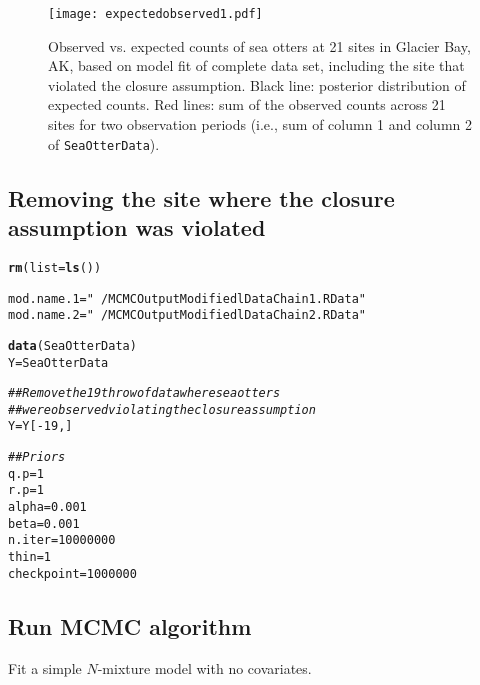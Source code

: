 \documentclass[12pt,letterpaper,final]{article}\usepackage[]{graphicx}\usepackage[]{color}
\makeatletter
\newcommand{\hlnum}[1]{\textcolor[rgb]{0.686,0.059,0.569}{#1}}%
\newcommand{\hlstr}[1]{\textcolor[rgb]{0.192,0.494,0.8}{#1}}%
\newcommand{\hlcom}[1]{\textcolor[rgb]{0.678,0.584,0.686}{\textit{#1}}}%
\newcommand{\hlopt}[1]{\textcolor[rgb]{0,0,0}{#1}}%
\newcommand{\hlstd}[1]{\textcolor[rgb]{0.345,0.345,0.345}{#1}}%
\newcommand{\hlkwb}[1]{\textcolor[rgb]{0.69,0.353,0.396}{#1}}%
\newcommand{\hlkwc}[1]{\textcolor[rgb]{0.333,0.667,0.333}{#1}}%
\newcommand{\hlkwd}[1]{\textcolor[rgb]{0.737,0.353,0.396}{\textbf{#1}}}%
\newenvironment{kframe}{%
 \def\at@end@of@kframe{}%
 \ifinner\ifhmode%
  \def\at@end@of@kframe{\end{minipage}}%
  \begin{minipage}{\columnwidth}%
 \fi\fi%
 \def\FrameCommand##1{\hskip\@totalleftmargin \hskip-\fboxsep
 \colorbox{shadecolor}{##1}\hskip-\fboxsep
     \hskip-\linewidth \hskip-\@totalleftmargin \hskip\columnwidth}%
 \MakeFramed {\advance\hsize-\width
   \@totalleftmargin\z@ \linewidth\hsize
   \@setminipage}}%
 {\par\unskip\endMakeFramed%
 \at@end@of@kframe}
\newenvironment{knitrout}{}{} %
\makeatother
\begin{document}
\begin{center}
  \begin{figure}[H]
    \texttt{[image: expectedobserved1.pdf]}
    \caption[Observed vs. expected -- all data]{Observed vs. expected
      counts of sea otters at 21 sites in Glacier Bay, AK, based on
      model fit of complete data set, including the site that violated
      the closure assumption. Black line: posterior distribution of
      expected counts. Red lines: sum of the observed counts across 21
      sites for two observation periods (i.e., sum of column 1 and column 2 of \texttt{SeaOtterData}).}
  \end{figure}
\end{center}


\subsection{Removing the site where the closure assumption was
  violated}

\begin{knitrout}
\color{fgcolor}\begin{kframe}
\begin{alltt}
\hlkwd{rm}\hlstd{(}\hlkwc{list}\hlstd{=}\hlkwd{ls}\hlstd{())}

\hlstd{mod.name.1}\hlkwb{=}\hlstr{"~/MCMCOutputModifiedlDataChain1.RData"}
\hlstd{mod.name.2}\hlkwb{=}\hlstr{"~/MCMCOutputModifiedlDataChain2.RData"}

\hlkwd{data}\hlstd{(SeaOtterData)}
\hlstd{Y}\hlkwb{=}\hlstd{SeaOtterData}

\hlcom{## Remove the 19th row of data where sea otters}
\hlcom{## were observed violating the closure assumption}
\hlstd{Y}\hlkwb{=}\hlstd{Y[}\hlopt{-}\hlnum{19}\hlstd{,]}

\hlcom{## Priors}
\hlstd{q.p}\hlkwb{=}\hlnum{1}
\hlstd{r.p}\hlkwb{=}\hlnum{1}
\hlstd{alpha}\hlkwb{=}\hlnum{0.001}
\hlstd{beta}\hlkwb{=}\hlnum{0.001}
\hlstd{n.iter}\hlkwb{=}\hlnum{10000000}
\hlstd{thin}\hlkwb{=}\hlnum{1}
\hlstd{checkpoint}\hlkwb{=}\hlnum{1000000}
\end{alltt}
\end{kframe}
\end{knitrout}

\subsection{Run MCMC algorithm}
Fit a simple $N$-mixture model with no covariates.
\end{document}
